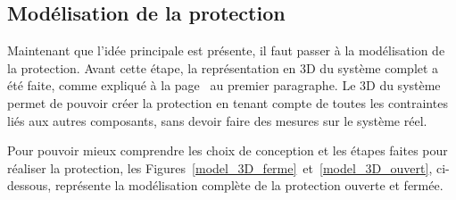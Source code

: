 \begin{minipage}{\textwidth}
    \subsection{Modélisation de la protection}
    Maintenant que l'idée principale est présente, il faut passer à la modélisation de la protection. Avant cette étape, la représentation en 3D du système complet a été faite, comme expliqué à la page~\pageref{modelisation_3D} au premier paragraphe. Le 3D du système permet de pouvoir créer la protection en tenant compte de  toutes les contraintes liés aux autres composants, sans devoir faire des mesures sur le système réel.

    Pour pouvoir mieux comprendre les choix de conception et les étapes faites pour réaliser la protection, les Figures~\ref{model_3D_ferme}~et~\ref{model_3D_ouvert}, ci-dessous, représente la modélisation complète de la protection ouverte et fermée.


\end{minipage}
